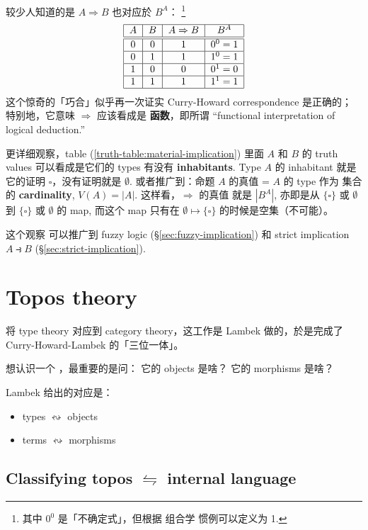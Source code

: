 较少人知道的是 $A \Rightarrow B$ 也对应於 $B^A$： \footnote{其中 $0^0$ 是「不确定式」，但根据 组合学 惯例可以定义为 1.}
\begin{equation}
\label{truth-table:material-implication}
\begin{tabular}{|c|c|c|c|}
	\hline 
	$A$ & $B$ & $A \Rightarrow B$ & $B^A$ \\ 
	\hline \hline 
	0 & 0 & 1 & $0^0 = 1$ \\
	\hline 
	0 & 1 & 1 & $1^0 = 1$ \\ 
	\hline 
	1 & 0 & 0 & $0^1 = 0$ \\ 
	\hline 
	1 & 1 & 1 & $1^1 = 1$ \\ 
	\hline 
\end{tabular} 
\end{equation}
这个惊奇的「巧合」似乎再一次证实 Curry-Howard correspondence 是正确的； 特别地，它意味 $\Rightarrow$ 应该看成是 \textbf{函数}，即所谓 ``functional interpretation of logical deduction.'' 

更详细观察，table (\ref{truth-table:material-implication}) 里面 $A$ 和 $B$ 的 truth values 可以看成是它们的 types 有没有 \textbf{inhabitants}. Type $A$ 的 inhabitant 就是它的证明 $\square$，没有证明就是 $\emptyset$.  或者推广到：命题 $A$ 的真值 = $A$ 的 type 作为 集合 的 \textbf{cardinality}, $V(A) = |A|$.  这样看，$\Rightarrow$ 的真值 就是 $|B^A|$, 亦即是从 $\{\square\}$ 或 $\emptyset$ 到 $\{\square\}$ 或 $\emptyset$ 的 map, 而这个 map 只有在 $\emptyset \mapsto \{\square\}$ 的时候是空集（不可能）。

这个观察 可以推广到 fuzzy logic (\S\ref{sec:fuzzy-implication}) 和 strict implication $A \strictif B$ (\S\ref{sec:strict-implication}).

\section{Topos theory}

将 type theory 对应到 category theory，这工作是 Lambek 做的，於是完成了 Curry-Howard-Lambek 的「三位一体」。

想认识一个 ，最重要的是问： 它的 objects 是啥？ 它的 morphisms 是啥？ 

Lambek 给出的对应是：
\begin{itemize}
	\item types $\leftrightsquigarrow$ objects
	\item terms $\leftrightsquigarrow$ morphisms
\end{itemize}

\subsection{Classifying topos $\leftrightharpoons$ internal language}

